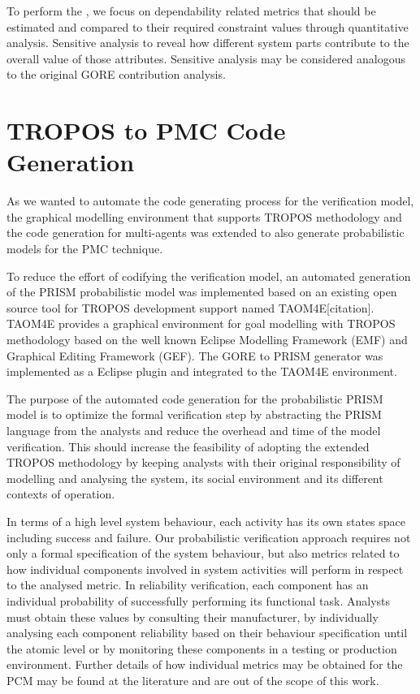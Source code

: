 To perform the , we focus on dependability related metrics that should be estimated and compared to their required constraint values through quantitative analysis. Sensitive analysis to reveal how different system parts contribute to the overall value of those attributes. Sensitive analysis may be considered analogous to the original GORE contribution analysis.



\section{TROPOS to PMC Code Generation}

As we wanted to automate the code generating process for the verification model, the graphical modelling environment that supports TROPOS methodology and the code generation for multi-agents was extended to also generate probabilistic models for the PMC technique.

To reduce the effort of codifying the verification model, an automated generation of the PRISM probabilistic model was implemented based on an existing open source tool for TROPOS development support named TAOM4E[citation]. TAOM4E provides a graphical environment for goal modelling with TROPOS methodology based on the well known Eclipse Modelling Framework (EMF) and Graphical Editing Framework (GEF). The GORE to PRISM generator was implemented as a Eclipse plugin and integrated to the TAOM4E environment. 

The purpose  of the automated code generation for the probabilistic PRISM model is to optimize the formal verification step by abstracting the PRISM language from the analysts and reduce the overhead and time of the model verification. This should increase the feasibility of adopting the extended TROPOS methodology by keeping analysts with their original responsibility of modelling and analysing the system, its social environment and its different contexts of operation.






In terms of a high level system behaviour, each activity has its own states space including success and failure. Our probabilistic verification approach requires not only a formal specification of the system behaviour, but also metrics related to how individual components involved in system activities will perform in respect to the analysed metric. In reliability verification, each component has an individual probability of successfully performing its functional task. Analysts must obtain these values by consulting their manufacturer, by individually analysing each component reliability based on their behaviour specification until the atomic level or by monitoring these components in a testing or production environment. Further details of how individual metrics may be obtained for the PCM may be found at the literature and are out of the scope of this work.
